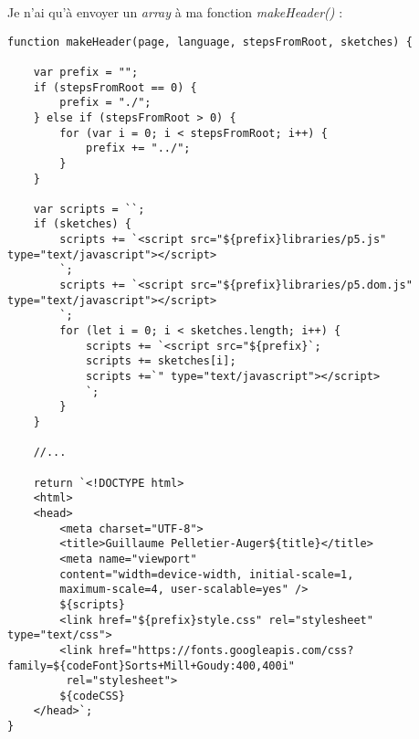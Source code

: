 Je n'ai qu'à envoyer un \textit{array} à ma fonction \textit{makeHeader()} :

\begin{lstlisting}
function makeHeader(page, language, stepsFromRoot, sketches) {

    var prefix = "";
    if (stepsFromRoot == 0) {
        prefix = "./";
    } else if (stepsFromRoot > 0) {
        for (var i = 0; i < stepsFromRoot; i++) {
            prefix += "../";
        }
    }

    var scripts = ``;
    if (sketches) {
        scripts += `<script src="${prefix}libraries/p5.js" type="text/javascript"></script>
        `;
        scripts += `<script src="${prefix}libraries/p5.dom.js" type="text/javascript"></script>   
        `;       
        for (let i = 0; i < sketches.length; i++) {
            scripts += `<script src="${prefix}`;
            scripts += sketches[i];
            scripts +=`" type="text/javascript"></script>
            `;
        }
    }

    //...

    return `<!DOCTYPE html>
    <html>
    <head>
        <meta charset="UTF-8">
        <title>Guillaume Pelletier-Auger${title}</title>
        <meta name="viewport" 
        content="width=device-width, initial-scale=1, 
        maximum-scale=4, user-scalable=yes" />
        ${scripts}
        <link href="${prefix}style.css" rel="stylesheet" type="text/css">
        <link href="https://fonts.googleapis.com/css?family=${codeFont}Sorts+Mill+Goudy:400,400i"
         rel="stylesheet">
        ${codeCSS}
    </head>`;
}
\end{lstlisting}